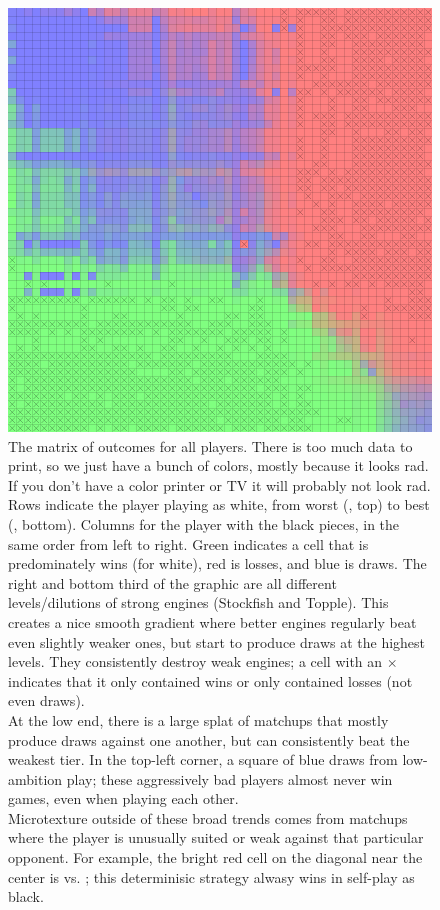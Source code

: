 \documentclass[10pt,preprint,twocolumn]{acmart}
\begin{document}
\begin{figure}[ht]
  \includegraphics[width=\linewidth]{elo-heatmap}
  \caption{ The matrix of outcomes for all players. There is too much
    data to print, so we just have a bunch of colors, mostly because
    it looks rad. If you don't have a color printer or TV it will
    probably not look rad. Rows indicate the player playing as white,
    from worst (, top) to best
    (, bottom). Columns for the player with the
    black pieces, in the same order from left to right. Green
    indicates a cell that is predominately wins (for white), red is
    losses, and blue is draws. The right and bottom third of the
    graphic are all different levels/dilutions of strong engines
    (Stockfish and Topple). This creates a nice smooth gradient where
    better engines regularly beat even slightly weaker ones, but start
    to produce draws at the highest levels. They consistently destroy
    weak engines; a cell with an $\times$ indicates that it only
    contained wins or only contained losses (not even draws).
    \\
    At the low end, there is a large splat of matchups that mostly
    produce draws against one another, but can consistently beat
    the weakest tier. In the top-left corner, a square of blue
    draws from low-ambition play; these aggressively bad players
    almost never win games, even when playing each other.
    \\
    Microtexture outside of these broad trends comes from matchups
    where the player is unusually suited or weak against that
    particular opponent. For example, the bright red cell on the
    diagonal near the center is  vs. ; this
    determinisic strategy alwasy wins in self-play as black.
  } \label{fig:heatmap}
\end{figure}
\end{document}
